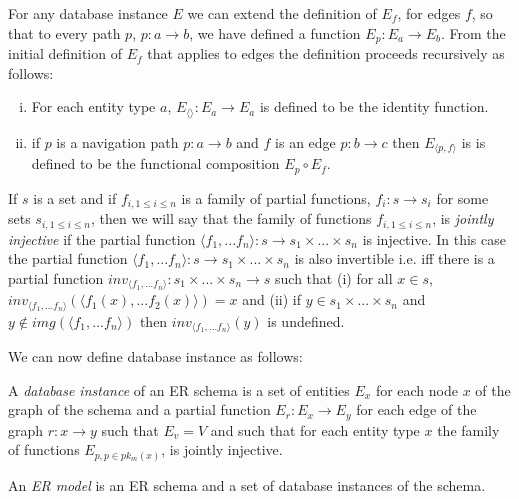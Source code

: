 \documentclass[10pt,a4paper]{article}
\newcommand{\commentary}[1]{\marginpar{\footnotesize #1}}
\newcommand{\genericmodel}{\mathcal{M}}
\renewcommand{\genericmodel}{{m}}
\newcommand{\veee}{v}
\newcommand{\Veee}{V}
\newcommand{\pk}[2] [\genericmodel]{pk_{#1}(#2)}
\newcommand{\term}[1]{\textit{{#1}}}
\begin{document}
\noindent For any database instance $E$ we can  extend  the definition of
$E_f$, for edges $f$,  so that to every path $p$, $p: a \rightarrow b$,  we have defined a function $E_p: E_a \rightarrow E_b$. From the initial definition of $E_f$ that applies to 
edges the definition proceeds recursively as follows: 
\begin{enumerate} [(i)]
\item{  For each entity type $a$, $E_{\langle \rangle}: E_a \rightarrow E_a$ is defined to be the identity function.
}
\item{   if $p$ is a navigation path $p: a \rightarrow b$ and $f$ is an edge $p: b \rightarrow c$ then $E_{\langle p,f \rangle}$ is 
is defined to be the functional composition $E_p \circ E_f$.
}
\end{enumerate}

\begin{definition}
If $s$ is a set and if $f_{i, 1\leq i \leq n}$ is a family of partial functions, $f_i: s \rightarrow s_i$   for some sets $s_{i, 1 \leq i \leq n}$,  then
we will say that the family of functions $f_{i, 1\leq i \leq n}$, is \term{jointly injective} if the partial function $\langle f_1,...f_n\rangle: s \rightarrow
s_1 \times ... \times s_n $ is injective. In this case the partial function $\langle f_1,...f_n\rangle: s \rightarrow
s_1 \times ... \times s_n $ is also invertible i.e. iff there is a partial function $inv_{\langle f_1,...f_n\rangle} : s_1 \times ... \times s_n \rightarrow s$ such that
(i) for all $x \in s$, $inv_{\langle f_1,...f_n\rangle}(\langle f_1(x),...f_2(x) \rangle ) = x$ and (ii) if $y \in s_1 \times ... \times s_n $ and
$y \notin img(\langle f_1,...f_n\rangle)$ then $inv_{\langle f_1,...f_n\rangle}(y)$ is undefined. \\
\end{definition}


\noindent We can now define database instance  as follows:
\begin{definition}
\noindent A \term{database instance}  of an ER schema is
a set of entities $E_x$ for each node $x$ of the graph of the schema and 
a partial function $E_r : E_x \rightarrow E_y$ for each edge of the graph $r:x \rightarrow y$ 
such that $E_\veee=\Veee$
and such that 
for each entity type $x$ 
the family of functions $E_{p, p \in \pk{x}}$\commentary{Need define $E_p$, for $p$ a path}, is jointly injective.
\end{definition}

\begin{definition}
\noindent An \term{ER model} is an ER schema and a set of database instances of the schema. \\
\end{definition}
\end{document}
